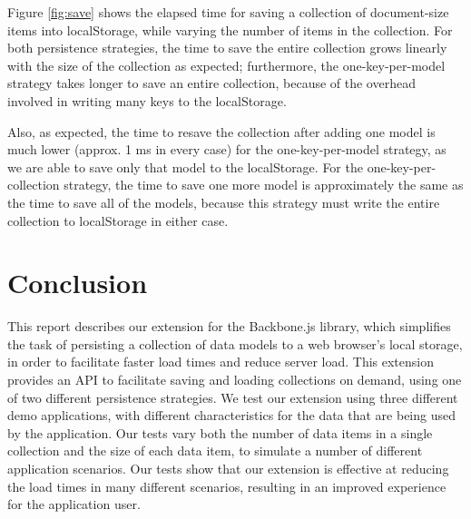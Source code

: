 \documentclass[12pt]{article}
\begin{document}
Figure \ref{fig:save} shows the elapsed time for saving a collection of
document-size items into localStorage, while varying the number of items in the
collection. For both persistence strategies, the time to save the entire
collection grows linearly with the size of the collection as expected;
furthermore, the one-key-per-model strategy takes longer to save an entire
collection, because of the overhead involved in writing many keys to the
localStorage.

Also, as expected, the time to resave the collection after adding one model is
much lower (approx. 1 ms in every case) for the one-key-per-model strategy, as
we are able to save only that model to the localStorage. For the
one-key-per-collection strategy, the time to save one more model is
approximately the same as the time to save all of the models, because this
strategy must write the entire collection to localStorage in either case.

\section{Conclusion}

This report describes our extension for the Backbone.js library, which
simplifies the task of persisting a collection of data models to a web
browser's local storage, in order to facilitate faster load times and reduce
server load. This extension provides an API to facilitate saving and loading
collections on demand, using one of two different persistence strategies. We
test our extension using three different demo applications, with different
characteristics for the data that are being used by the application. Our tests
vary both the number of data items in a single collection and the size of
each data item, to simulate a number of different application scenarios. Our
tests show that our extension is effective at reducing the load times in many
different scenarios, resulting in an improved experience for the application
user.



\end{document}
